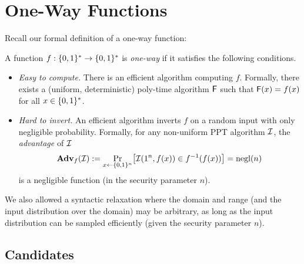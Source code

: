 \documentclass[11pt]{article}
\begin{document}
\thispagestyle{fancy}           %


\section{One-Way Functions}
\label{sec:one-way-functions}

Recall our formal definition of a one-way function:
\begin{definition}
  \label{def:owf}
  A function $f : \{0,1\}^{*} \to \{0,1\}^{*}$ is \emph{one-way} if it
  satisfies the following conditions.
  \begin{itemize}
  \item \emph{Easy to compute.}  There is an efficient algorithm
    computing $f$.  Formally, there exists a (uniform, deterministic)
    poly-time algorithm $\mathsf{F}$ such that $\mathsf{F}(x) = f(x)$ for
    all $x \in \{0,1\}^{*}$.
  \item \emph{Hard to invert.}  An efficient algorithm inverts $f$ on
    a random input with only negligible probability.  Formally, for
    any non-uniform PPT algorithm $\mathcal{I}$, the \emph{advantage} of
    $\mathcal{I}$ \[ \advan_{f}(\Inv) := \Pr_{x \gets \bit^{n}} \bracks*{
      \Inv(1^{n}, f(x)) \in f^{-1}(f(x)) } = \negl(n) \] is a
    negligible function (in the security parameter $n$).
  \end{itemize}
\end{definition}
We also allowed a syntactic relaxation where the domain and range (and
the input distribution over the domain) may be arbitrary, as long as
the input distribution can be sampled efficiently (given the security
parameter $n$).

\subsection{Candidates}
\label{sec:candidates}
\end{document}
